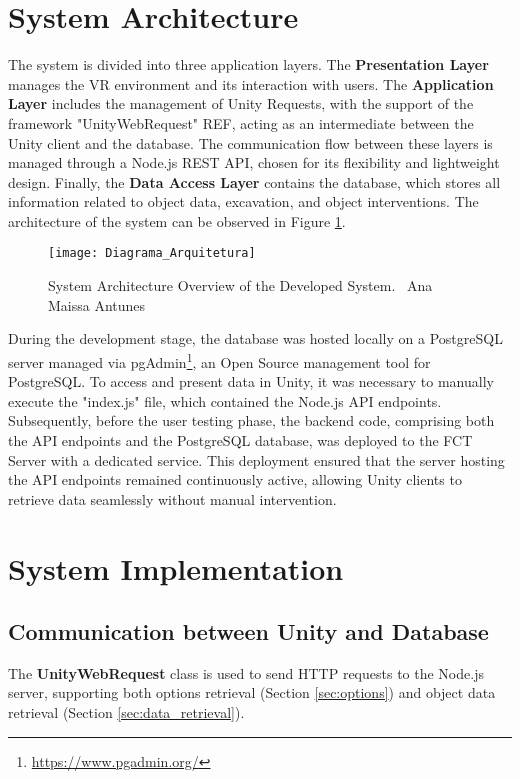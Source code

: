 \section{System Architecture}

The system is divided into three application layers.
The \textbf{Presentation Layer} manages the \gls{VR} environment and its interaction with users. The \textbf{Application Layer} includes the management of Unity Requests, with the support of the framework "UnityWebRequest" REF, acting as an intermediate between the Unity client and the database. 
The communication flow between these layers is managed through a Node.js REST API, chosen for its flexibility and lightweight design. 
Finally, the \textbf{Data Access Layer} contains the database, which stores all information related to object data, excavation, and object interventions. 
The architecture of the system can be observed in Figure \ref{fig:architecture}.
\begin{figure}[h!]
    \centering
    \texttt{[image: Diagrama\_Arquitetura]}
    \caption{System Architecture Overview of the Developed System. \textcopyright\ Ana Maissa Antunes}
    \label{fig:architecture}
\end{figure}

During the development stage, the database was hosted locally on a PostgreSQL server managed via pgAdmin\footnote{\url{https://www.pgadmin.org/}}, an Open Source management tool for PostgreSQL. To access and present data in Unity, it was necessary to manually execute the "index.js" file, which contained the Node.js API endpoints.
Subsequently, before the user testing phase, the backend code, comprising both the API endpoints and the PostgreSQL database, was deployed to the \gls{FCT} Server with a dedicated service.
This deployment ensured that the server hosting the API endpoints remained continuously active, allowing Unity clients to retrieve data seamlessly without manual intervention.

\section{System Implementation}

\subsection{Communication between Unity and Database}

The \textbf{UnityWebRequest} class is used to send HTTP requests to the Node.js server, supporting both options retrieval (Section \ref{sec:options}) and object data retrieval (Section \ref{sec:data_retrieval}).

